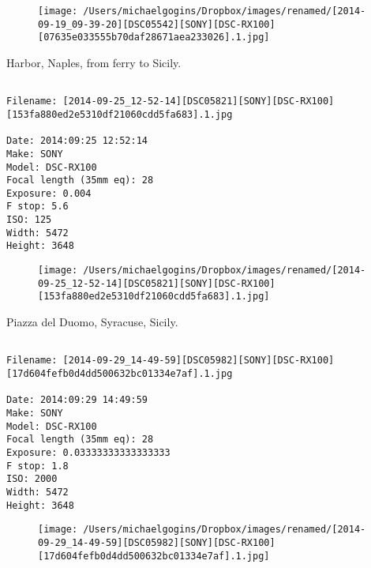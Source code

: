 \documentclass[11pt,letter,DIV=14,paper=landscape]{scrbook}
\begin{document}
\begin{figure}
\texttt{[image: /Users/michaelgogins/Dropbox/images/renamed/[2014-09-19\_09-39-20][DSC05542][SONY][DSC-RX100][07635e033555b70daf28671aea233026].1.jpg]}
\end{figure}
    
\clearpage
\noindent Harbor, Naples, from ferry to Sicily.
\noindent
\begin{lstlisting}

Filename: [2014-09-25_12-52-14][DSC05821][SONY][DSC-RX100][153fa880ed2e5310df21060cdd5fa683].1.jpg

Date: 2014:09:25 12:52:14
Make: SONY
Model: DSC-RX100
Focal length (35mm eq): 28
Exposure: 0.004
F stop: 5.6
ISO: 125
Width: 5472
Height: 3648
\end{lstlisting}
\clearpage

\begin{figure}
\texttt{[image: /Users/michaelgogins/Dropbox/images/renamed/[2014-09-25\_12-52-14][DSC05821][SONY][DSC-RX100][153fa880ed2e5310df21060cdd5fa683].1.jpg]}
\end{figure}
    
\clearpage
\noindent Piazza del Duomo, Syracuse, Sicily.
\noindent
\begin{lstlisting}

Filename: [2014-09-29_14-49-59][DSC05982][SONY][DSC-RX100][17d604fefb0d4dd500632bc01334e7af].1.jpg

Date: 2014:09:29 14:49:59
Make: SONY
Model: DSC-RX100
Focal length (35mm eq): 28
Exposure: 0.03333333333333333
F stop: 1.8
ISO: 2000
Width: 5472
Height: 3648
\end{lstlisting}
\clearpage

\begin{figure}
\texttt{[image: /Users/michaelgogins/Dropbox/images/renamed/[2014-09-29\_14-49-59][DSC05982][SONY][DSC-RX100][17d604fefb0d4dd500632bc01334e7af].1.jpg]}
\end{figure}
    
\end{document}
